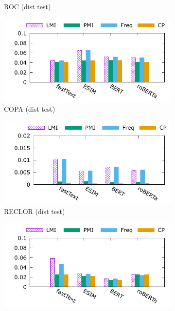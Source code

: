 \begin{figure}[th]
\begin{subfigure}[b]{0.24\textwidth}
\caption{ROC (dist test)}
\label{fig:d_cue_roc}
\end{subfigure}
\hfill
\newpage
\begin{subfigure}[b]{0.24\textwidth}
\centering
\includegraphics[width=\columnwidth]{data/dist_copa.pdf}
\caption{COPA (dist test)}
\label{fig:d_cue_copa}
\end{subfigure}
\hfill
\begin{subfigure}[b]{0.24\textwidth}
\centering
\includegraphics[width=\columnwidth]{data/dist_reclor.pdf}
\caption{RECLOR (dist test)}
\label{fig:d_cue_reclor}
\end{subfigure}
\hfill
\begin{subfigure}[b]{0.24\textwidth}
\centering
\includegraphics[width=\columnwidth]{data/dist_arct.pdf}

\end{subfigure}
\end{figure}
